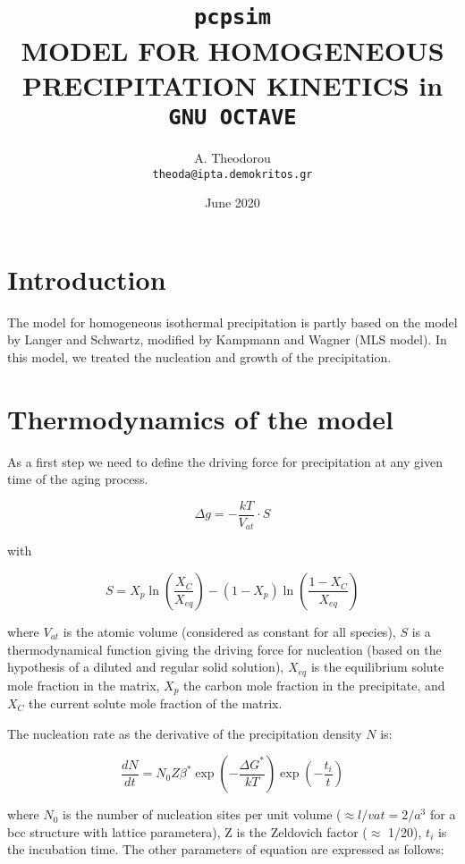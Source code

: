 \documentclass[12pt,a4paper]{article}
\author{
  A. Theodorou\\
  \texttt{theoda@ipta.demokritos.gr}

}
\date{June 2020}
\title{\texttt{pcpsim} \\ 
MODEL FOR HOMOGENEOUS PRECIPITATION KINETICS in \texttt{GNU OCTAVE}
}
\begin{document}
\maketitle

\section{Introduction}
The model for homogeneous isothermal precipitation is partly based on the model by Langer and Schwartz, modified by Kampmann and Wagner (MLS model). In this model, we treated the nucleation and growth of the precipitation.


\section{Thermodynamics of the model}

As a first step we need to define the driving force for precipitation at any given time of the aging process.
 
\begin{equation}
\Delta g = - \frac{kT}{V_{at}} \cdot S 
\end{equation}

with

\begin{equation}
S =  X_p \ln(\frac{X_C}{X_{eq}} ) - (1 - X_p) \ln(\frac{1 - X_C}{X_{eq}}) 
\end{equation}

where $V_{at}$ is the atomic volume (considered as constant for all species), $S$ is a thermodynamical  function giving the driving force for nucleation (based
on the hypothesis of a diluted and regular solid solution), $X_{eq}$ is the equilibrium solute mole fraction in the matrix, $X_p$ the carbon mole fraction in the precipitate, and $X_C$ the current solute mole fraction of the matrix.

The nucleation rate as the derivative of the precipitation density $N$ is:

\begin{equation}
\label{P_density}
\frac{d N}{d t} = N_0 Z \beta^* \exp(-\frac{\Delta G^*}{kT}) \exp(-\frac{t_i}{t})
\end{equation}

where $N_0$ is the number of nucleation sites per unit volume ($\approx  l/vat =2/a^3$ for a bcc structure with lattice parametera), Z is the Zeldovich factor ($\approx$ 1/20), $t_i$ is the incubation time. The other parameters of equation are expressed as follows:
\end{document}
